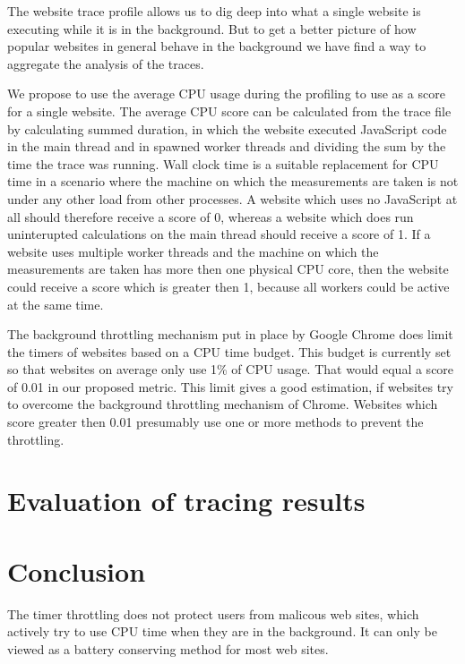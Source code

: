 \documentclass[article,type=bsc,colorback,accentcolor=tud9c]{tudthesis}
\begin{document}
  The website trace profile allows us to dig deep into what a single website is executing while it is in the background. But to get a better picture of how popular websites in general behave in the background we have find a way to aggregate the analysis of the traces.

  We propose to use the average CPU usage during the profiling to use as a score for a single website. The average CPU score can be calculated from the trace file by calculating summed duration, in which the website executed JavaScript code in the main thread and in spawned worker threads and dividing the sum by the time the trace was running. Wall clock time is a suitable replacement for CPU time in a scenario where the machine on which the measurements are taken is not under any other load from other processes. A website which uses no JavaScript at all should therefore receive a score of 0, whereas a website which does run uninterupted calculations on the main thread should receive a score of 1. If a website uses multiple worker threads and the machine on which the measurements are taken has more then one physical CPU core, then the website could receive a score which is greater then 1, because all workers could be active at the same time.

  The background throttling mechanism put in place by Google Chrome does limit the timers of websites based on a CPU time budget. This budget is currently set so that websites on average only use 1\% of CPU usage. That would equal a score of 0.01 in our proposed metric. This limit gives a good estimation, if websites try to overcome the background throttling mechanism of Chrome. Websites which score greater then 0.01 presumably use one or more methods to prevent the throttling.

  


  
  \newpage
  \section{Evaluation of tracing results}
  
  \newpage
  \section{Conclusion}

  The timer throttling does not protect users from malicous web sites, which actively try to use CPU time when they are in the background. It can only be viewed as a battery conserving method for most web sites.
\end{document}
